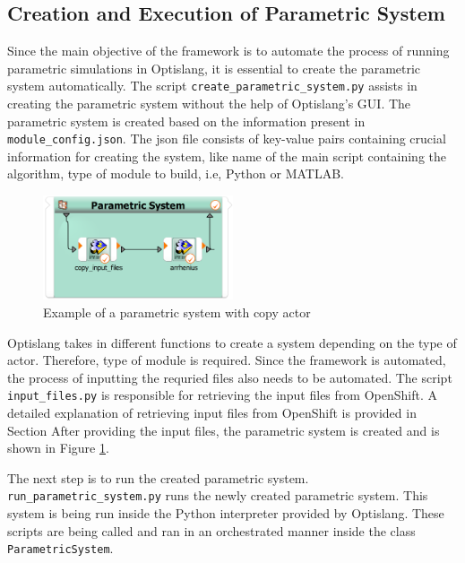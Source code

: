 \subsection{Creation and Execution of Parametric System}
Since the main objective of the framework is to automate the process of running parametric simulations in Optislang, it is essential to create the parametric 
system automatically. The script \texttt{create\_parametric\_system.py} assists in creating the parametric system without the help of Optislang's GUI. The 
parametric system is created based on the information present in \texttt{module\_config.json}. The \acrshort{json} file consists of key-value pairs containing 
crucial information for creating the system, like name of the main script containing the algorithm, type of module to build, i.e, Python or MATLAB. 
\begin{figure}[!ht]
  \centering
  \includegraphics[width=0.5\textwidth]{Images/parametric_system_with_copy_actor.png}
  \caption{Example of a parametric system with copy actor}
  \label{parametric_system_with_copy_actor}
\end{figure}

Optislang takes in different functions to create a system depending on the type of actor. Therefore, type of module is required. Since the framework is automated,
the process of inputting the requried files also needs to be automated. The script \texttt{input\_files.py} is responsible for retrieving the input files from 
OpenShift. A detailed explanation of retrieving input files from OpenShift is provided in Section %
After providing the input files, the parametric system is created and is shown in Figure \ref{parametric_system_with_copy_actor}. 

The next step is to run the created parametric system. \texttt{run\_parametric\_system.py} runs the newly created parametric system. This system is being run 
inside the Python interpreter provided by Optislang. These scripts are being called and ran in an orchestrated manner inside the class \texttt{ParametricSystem}.


